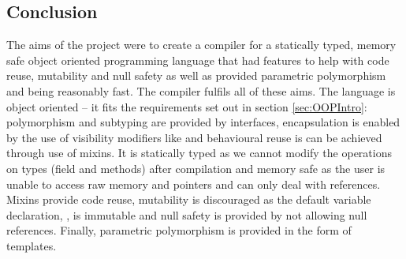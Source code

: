 \documentclass{article}
\newcommand{\bt}{\ensuremath{^{\backprime}}}
\newcommand{\sharponend}[1]{{\settoheight{\dimen0}{#1}#1\kern-.05em \resizebox{!}{\dimen0}{\raisebox{\depth}{\fontseries{b}\selectfont\#}}}}
\newcommand{\fsharp}{\sharponend{F}\xspace}
\newcommand{\code}[1]{\texttt{\StrSubstitute{#1}{`}{\bt}}}
\newcommand{\bcode}[1]{\code{#1}}
\begin{document}
\subsection{Conclusion}
The aims of the project were to create a compiler for a statically typed, memory safe object oriented programming language that had features to help with code reuse, mutability and null safety as well as provided parametric polymorphism and being reasonably fast. The compiler fulfils all of these aims.
The language is object oriented -- it fits the requirements set out in section \ref{sec:OOPIntro}: polymorphism and subtyping are provided by interfaces, encapsulation is enabled by the use of visibility modifiers like \bcode{private} and behavioural reuse is can be achieved through use of mixins. It is statically typed as we cannot modify the operations on types (field and methods) after compilation and memory safe as the user is unable to access raw memory and pointers and can only deal with references. Mixins provide code reuse, mutability is discouraged as the default variable declaration, \bcode{val}, is immutable and null safety is provided by not allowing null references. Finally, parametric polymorphism is provided in the form of templates.



\printbibliography
\end{document}
